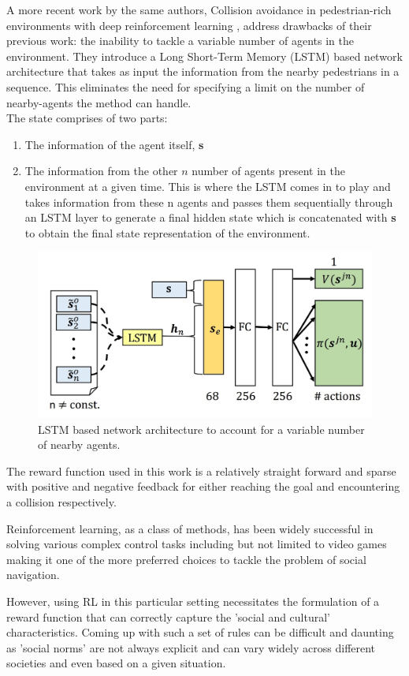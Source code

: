 A more recent work by the same authors, Collision avoidance in pedestrian-rich environments with deep reinforcement learning \cite{everett_collision_2019}, 
address drawbacks of their previous work: the inability to tackle a variable number of agents in the environment. They introduce a Long Short-Term Memory (LSTM) \cite{hochreiterLongShortTermMemory1997} based network architecture that takes as input the information from the nearby pedestrians in a sequence. This eliminates the need for specifying a limit on the number of nearby-agents the method can handle.\\
The state comprises of two parts: 
\begin{enumerate}
    \item The information of the agent itself, \textbf{s}
    \item The information from the other $n$ number of agents present in the environment at a given time. This is where the LSTM comes in to play and takes information from these n agents and passes them sequentially through an LSTM layer to generate a final hidden state which is concatenated with \textbf{s} to obtain the final state representation of the environment.
\end{enumerate}
\begin{figure}[!htbp]
    \centering
    \includegraphics[width=0.6\linewidth]{figures/everett}
    \caption{LSTM based network architecture to account for a variable number of nearby agents.}
    \label{fig:label2}
\end{figure}

The reward function used in this work is a relatively straight forward and sparse with positive and negative feedback for either reaching the goal and encountering a collision respectively.

Reinforcement learning, as a class of methods, has been widely successful in solving various complex control tasks including but not limited to video games making it one of the more preferred choices to tackle the problem of social navigation. \par
However, using RL in this particular setting necessitates the formulation of a reward function that can correctly capture the 'social and cultural' characteristics. Coming up with such a set of rules can be difficult and daunting as 'social norms' are not always explicit and can vary widely across different societies and even based on a given situation.\\


